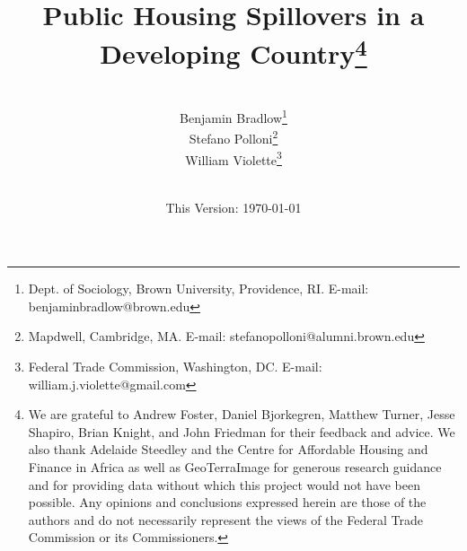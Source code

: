 \documentclass[12pt]{article}
\begin{document}
\begin{titlepage} 
\title{{Public Housing Spillovers in a Developing Country}\thanks{We are grateful to Andrew Foster, Daniel Bjorkegren, Matthew Turner, Jesse Shapiro, Brian Knight, and John Friedman for their feedback and advice.  We also thank Adelaide Steedley and the Centre for Affordable Housing and Finance in Africa as well as GeoTerraImage for generous research guidance and for providing data without which this project would not have been possible.  Any opinions and conclusions expressed herein are those of the authors and do not necessarily represent the views of the Federal Trade Commission or its Commissioners.}}
\author{\\[3em] Benjamin Bradlow\thanks{Dept. of Sociology, Brown University, Providence, RI.  E-mail: benjamin\textunderscore bradlow@brown.edu}\\
 Stefano Polloni\thanks{Mapdwell, Cambridge, MA.  E-mail: stefano\textunderscore polloni@alumni.brown.edu}\\ 
  William Violette\thanks{Federal Trade Commission, Washington, DC. E-mail: william.j.violette@gmail.com} \\
 \\ 
  }
\date{\vspace{5mm}This Version: \today}
\maketitle
\begin{abstract}











\end{abstract}
\end{titlepage}
\end{document}
